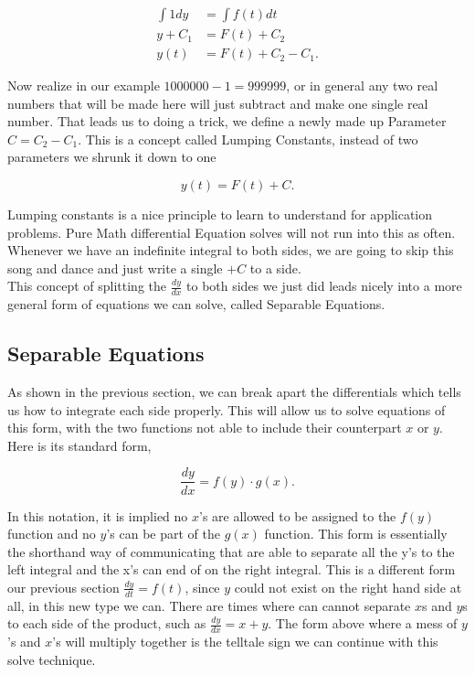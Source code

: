 \documentclass[12pt]{article}
\begin{document}
\begin{align*}
    \int 1 dy &= \int f(t)dt \\
    y+C_1 &= F(t)+C_2 \\
    y(t)&=F(t)+C_2-C_1.
\end{align*}

Now realize in our example $1000000-1=999999$, or in general any two real numbers that will be made here will just subtract and make one single real number. That leads us to doing a trick, we define a newly made up Parameter $C=C_2-C_1$. This is a concept called Lumping Constants, instead of two parameters we shrunk it down to one

\begin{equation*}
    y(t)=F(t)+C.
\end{equation*}

Lumping constants is a nice principle to learn to understand for application problems. Pure Math differential Equation solves will not run into this as often. Whenever we have an indefinite integral to both sides, we are going to skip this song and dance and just write a single $+C$ to a side. \\

This concept of splitting the $\frac{dy}{dx}$ to both sides we just did leads nicely into a more general form of equations we can solve, called Separable Equations.

\subsection{Separable Equations}

As shown in the previous section, we can break apart the differentials which tells us how to integrate each side properly. This will allow us to solve equations of this form, with the two functions not able to include their counterpart $x$ or $y$. Here is its standard form,

\begin{equation*}
    \frac{dy}{dx} = f(y)\cdot g(x).
\end{equation*}

In this notation, it is implied no $x$'s are allowed to be assigned to the $f(y)$ function and no $y$'s can be part of the $g(x)$ function. This form is essentially the shorthand way of communicating that are able to separate all the y's to the left integral and the x's can end of on the right integral. This is a different form our previous section $\frac{dy}{dt}=f(t)$, since $y$ could not exist on the right hand side at all, in this new type we can. There are times where can cannot separate $x$s and $y$s to each side of the product, such as $\frac{dy}{dx} = x+y$. The form above where a mess of $y$'s and $x$'s will multiply together is the telltale sign we can continue with this solve technique. \\
\end{document}
